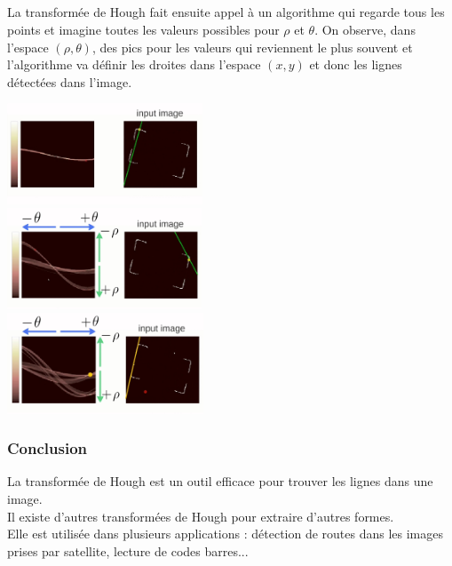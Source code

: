 \subparagraph{}
La transform\'ee de Hough fait ensuite appel \`a un algorithme qui regarde tous les points et imagine toutes les valeurs possibles pour $\rho$ et $\theta$.
On observe, dans l'espace $(\rho, \theta)$, des pics pour les valeurs qui reviennent le plus souvent et l'algorithme va d\'efinir les droites dans l'espace $(x, y)$ et donc les lignes d\'etect\'ees dans l'image.
\begin{center}
\includegraphics[height=3cm]{images/hough_5.png} \\
\includegraphics[height=3cm]{images/hough_6.png} \\ 
\includegraphics[height=3cm]{images/hough_7.png}
\end{center}

\subsubsection{Conclusion}
La transform\'ee de Hough est un outil efficace pour trouver les lignes dans une image. \\
Il existe d'autres transform\'ees de Hough pour extraire d'autres formes. \\
Elle est utilis\'ee dans plusieurs applications : d\'etection de routes dans les images prises par satellite, lecture de codes barres...